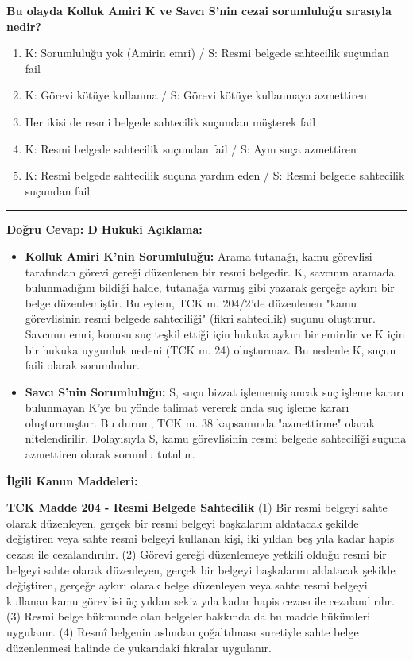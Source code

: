 \documentclass[a4paper, 11pt, twocolumn]{article}
\newenvironment{lawbox}{%
    \par\noindent
    \begin{tcolorbox}[
        colback=lawbg,
        colframe=boxcolor,
        fonttitle=\bfseries,
        boxrule=0.5pt,
        left=3pt,
        right=3pt,
        top=3pt,
        bottom=3pt,
        width=\columnwidth,
        arc=2pt,
        before skip=0.2cm,
        after skip=0.2cm
    ]
    \footnotesize\itshape
}{\end{tcolorbox}}
\begin{document}
\textbf{Bu olayda Kolluk Amiri K ve Savcı S'nin cezai sorumluluğu sırasıyla nedir?}
\begin{enumerate}[label=\Alph*)]
    \item K: Sorumluluğu yok (Amirin emri) / S: Resmi belgede sahtecilik suçundan fail
    \item K: Görevi kötüye kullanma / S: Görevi kötüye kullanmaya azmettiren
    \item Her ikisi de resmi belgede sahtecilik suçundan müşterek fail
    \item K: Resmi belgede sahtecilik suçundan fail / S: Aynı suça azmettiren
    \item K: Resmi belgede sahtecilik suçuna yardım eden / S: Resmi belgede sahtecilik suçundan fail
\end{enumerate}
\vspace{0.5cm}
\hrule
\vspace{0.5cm}
\textbf{Doğru Cevap: D}
\newline
\textbf{Hukuki Açıklama:}
\begin{itemize}
    \item \textbf{Kolluk Amiri K'nin Sorumluluğu:} Arama tutanağı, kamu görevlisi tarafından görevi gereği düzenlenen bir resmi belgedir. K, savcının aramada bulunmadığını bildiği halde, tutanağa varmış gibi yazarak gerçeğe aykırı bir belge düzenlemiştir. Bu eylem, TCK m. 204/2'de düzenlenen "kamu görevlisinin resmi belgede sahteciliği" (fikri sahtecilik) suçunu oluşturur. Savcının emri, konusu suç teşkil ettiği için hukuka aykırı bir emirdir ve K için bir hukuka uygunluk nedeni (TCK m. 24) oluşturmaz. Bu nedenle K, suçun faili olarak sorumludur.
    \item \textbf{Savcı S'nin Sorumluluğu:} S, suçu bizzat işlememiş ancak suç işleme kararı bulunmayan K'ye bu yönde talimat vererek onda suç işleme kararı oluşturmuştur. Bu durum, TCK m. 38 kapsamında "azmettirme" olarak nitelendirilir. Dolayısıyla S, kamu görevlisinin resmi belgede sahteciliği suçuna azmettiren olarak sorumlu tutulur.
\end{itemize}
\vspace{0.5cm}
\textbf{İlgili Kanun Maddeleri:}
\begin{lawbox}
\textbf{TCK Madde 204 - Resmi Belgede Sahtecilik}
\newline
(1) Bir resmi belgeyi sahte olarak düzenleyen, gerçek bir resmi belgeyi başkalarını aldatacak şekilde değiştiren veya sahte resmi belgeyi kullanan kişi, iki yıldan beş yıla kadar hapis cezası ile cezalandırılır.
\newline
(2) Görevi gereği düzenlemeye yetkili olduğu resmi bir belgeyi sahte olarak düzenleyen, gerçek bir belgeyi başkalarını aldatacak şekilde değiştiren, gerçeğe aykırı olarak belge düzenleyen veya sahte resmi belgeyi kullanan kamu görevlisi üç yıldan sekiz yıla kadar hapis cezası ile cezalandırılır.
\newline
(3) Resmi belge hükmunde olan belgeler hakkında da bu madde hükümleri uygulanır.
\newline
(4) Resmî belgenin aslından çoğaltılması suretiyle sahte belge düzenlenmesi halinde de yukarıdaki fıkralar uygulanır.
\end{lawbox}
\end{document}
